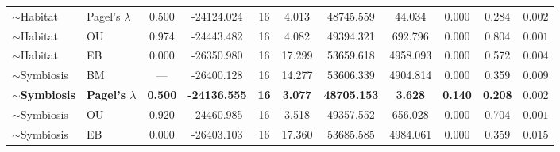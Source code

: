 \begin{table}
\begin{tabular}[t]{llccccccccc}
$\sim$Habitat & Pagel's $\lambda$ & 0.500 & -24124.024 & 16 & 4.013 & 48745.559 & 44.034 & 0.000 & 0.284 & $0.002$\\
$\sim$Habitat & OU & 0.974 & -24443.482 & 16 & 4.082 & 49394.321 & 692.796 & 0.000 & 0.804 & $0.001$\\
$\sim$Habitat & EB & 0.000 & -26350.980 & 16 & 17.299 & 53659.618 & 4958.093 & 0.000 & 0.572 & $0.004$\\
$\sim$Symbiosis & BM & --- & -26400.128 & 16 & 14.277 & 53606.339 & 4904.814 & 0.000 & 0.359 & $0.009$\\
\textbf{$\sim$Symbiosis} & \textbf{Pagel's $\lambda$} & \textbf{0.500} & \textbf{-24136.555} & \textbf{16} & \textbf{3.077} & \textbf{48705.153} & \textbf{3.628} & \textbf{0.140} & \textbf{0.208} & \textbf{$0.002$}\\
\addlinespace
$\sim$Symbiosis & OU & 0.920 & -24460.985 & 16 & 3.518 & 49357.552 & 656.028 & 0.000 & 0.704 & $0.001$\\
$\sim$Symbiosis & EB & 0.000 & -26403.103 & 16 & 17.360 & 53685.585 & 4984.061 & 0.000 & 0.359 & $0.015$\\
\bottomrule
\end{tabular}
\end{table}